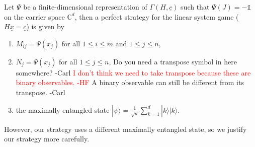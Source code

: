 \documentclass[11pt,letterpaper]{article}
\newcommand{\ket}[1]{|#1\rangle}
\newcommand{\C}{\mathbb{C}}
\newcommand{\1}{\mathbb{1}}
\newcommand{\ux}{\underline{x}}
\newcommand{\uc}{\underline{c}}
\newcommand{\sd}{\sqrt{d}}
\def\carl#1{{\color{blue} #1 -Carl}}
\newcommand{\hf}[1]{\textcolor{red}{#1}}
\theoremstyle{definition}
\begin{document}
Let $\Psi$ be a finite-dimensional representation of $\Gamma(H,\uc)$ such that $\Psi(J) = -\1$ on the carrier space $\C^d$, then a perfect strategy for 
the linear system game ($H\ux = \uc$) is given by 
\begin{enumerate}
	\item $M_{ij} = \Psi(x_j)$ for all $ 1 \leq i \leq m$ and $1 \leq j \leq n$,
	\item $N_j = \Psi(x_j)$ for all $1 \leq j \leq n$, \carl{Do you need a transpose symbol in here somewhere?}
	\hf{I don't think we need to take transpose because these are binary observables. -HF}  \carl{A binary observable can still be different from its transpose.}
	\item the maximally entangled state $\ket{\psi} = \frac{1}{\sd} \sum_{k=1}^d \ket{k}\ket{k}$.
\end{enumerate}
However, our strategy uses a different maximally entangled state,
so we justify our strategy more carefully.

\end{document}

